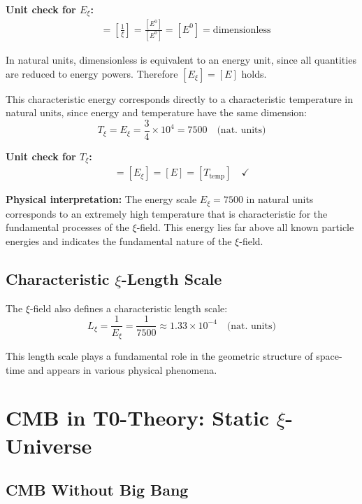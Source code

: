 	\textbf{Unit check for $E_\xi$:}
	\begin{align}
		[E_\xi] &= \left[\frac{1}{\xi}\right] = \frac{[E^0]}{[E^0]} = [E^0] = \text{dimensionless}
	\end{align}
	
	In natural units, dimensionless is equivalent to an energy unit, since all quantities are reduced to energy powers. Therefore $[E_\xi] = [E]$ holds.
	
	This characteristic energy corresponds directly to a characteristic temperature in natural units, since energy and temperature have the same dimension:
	\begin{equation}
		T_\xi = E_\xi = \frac{3}{4} \times 10^4 = 7500 \quad \text{(nat. units)}
	\end{equation}
	
	\textbf{Unit check for $T_\xi$:}
	\begin{align}
		[T_\xi] = [E_\xi] = [E] = [T_{\text{temp}}] \quad \checkmark
	\end{align}
	
	\textbf{Physical interpretation:} The energy scale $E_\xi = 7500$ in natural units corresponds to an extremely high temperature that is characteristic for the fundamental processes of the $\xi$-field. This energy lies far above all known particle energies and indicates the fundamental nature of the $\xi$-field.
	
	\subsection{Characteristic $\xi$-Length Scale}
	
	The $\xi$-field also defines a characteristic length scale:
	\begin{equation}
		L_\xi = \frac{1}{E_\xi} = \frac{1}{7500} \approx 1.33 \times 10^{-4} \quad \text{(nat. units)}
	\end{equation}
	
	This length scale plays a fundamental role in the geometric structure of space-time and appears in various physical phenomena.
	
	\section{CMB in T0-Theory: Static $\xi$-Universe}
	
	\subsection{CMB Without Big Bang}
	

